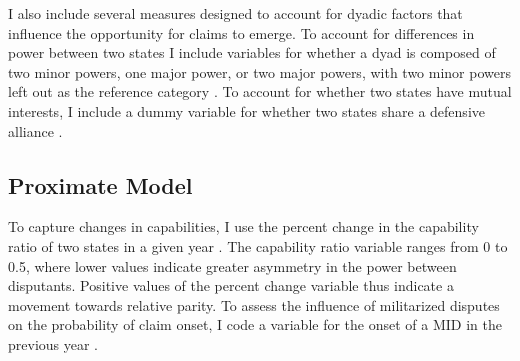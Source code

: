 



I also include several measures designed to account for dyadic factors that influence the opportunity for claims to emerge. To account for differences in power between two states I include variables for whether a dyad is composed of two minor powers, one major power, or two major powers, with two minor powers left out as the reference category \citep{cow2017}. To account for whether two states have mutual interests, I include a dummy variable for whether two states share a defensive alliance \citep{gibler2004}. 




\subsection{Proximate Model}


To capture changes in capabilities, I use the percent change in the capability ratio of two states in a given year \citep{singer1987}. The capability ratio variable ranges from 0 to 0.5, where lower values indicate greater asymmetry in the power between disputants. Positive values of the percent change variable thus indicate a movement towards relative parity. To assess the influence of militarized disputes on the probability of claim onset, I code a variable for the onset of a MID in the previous year \citep{gibler2016}.

